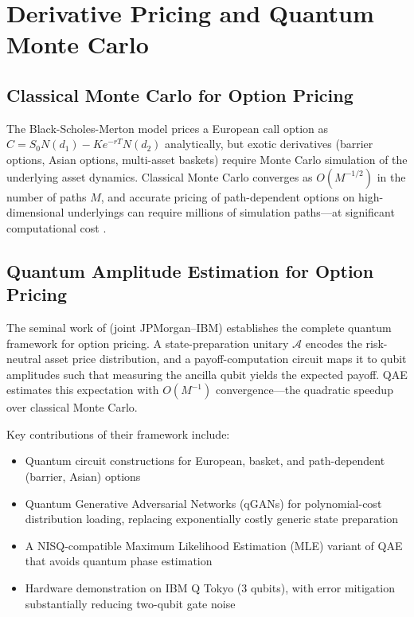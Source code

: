 \documentclass[12pt,a4paper]{article}
\begin{document}
\section{Derivative Pricing and Quantum Monte Carlo}
\label{sec:derivatives}

\subsection{Classical Monte Carlo for Option Pricing}

The Black-Scholes-Merton model prices a European call option as $C = S_0 N(d_1) - Ke^{-rT} N(d_2)$ analytically, but exotic derivatives (barrier options, Asian options, multi-asset baskets) require Monte Carlo simulation of the underlying asset dynamics. Classical Monte Carlo converges as $O(M^{-1/2})$ in the number of paths $M$, and accurate pricing of path-dependent options on high-dimensional underlyings can require millions of simulation paths---at significant computational cost \citep{zhou_quantum_2026, orus_quantum_2019}.

\subsection{Quantum Amplitude Estimation for Option Pricing}

The seminal work of \citet{stamatopoulos_option_2020} (joint JPMorgan--IBM) establishes the complete quantum framework for option pricing. A state-preparation unitary $\mathcal{A}$ encodes the risk-neutral asset price distribution, and a payoff-computation circuit maps it to qubit amplitudes such that measuring the ancilla qubit yields the expected payoff. QAE estimates this expectation with $O(M^{-1})$ convergence---the quadratic speedup over classical Monte Carlo.

Key contributions of their framework include:
\begin{itemize}[noitemsep]
    \item Quantum circuit constructions for European, basket, and path-dependent (barrier, Asian) options
    \item Quantum Generative Adversarial Networks (qGANs) for polynomial-cost distribution loading, replacing exponentially costly generic state preparation
    \item A NISQ-compatible Maximum Likelihood Estimation (MLE) variant of QAE that avoids quantum phase estimation
    \item Hardware demonstration on IBM Q Tokyo (3 qubits), with error mitigation substantially reducing two-qubit gate noise
\end{itemize}
\end{document}
